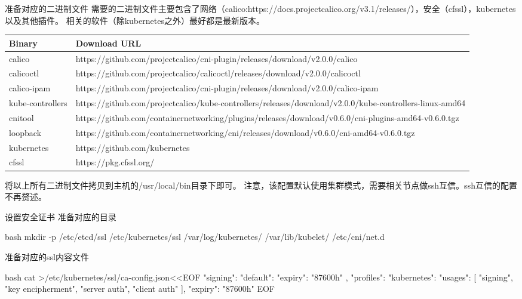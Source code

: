 \begin{outline}[enumerate]
  \1 准备对应的二进制文件
需要的二进制文件主要包含了网络（calico:https://docs.projectcalico.org/v3.1/releases/），安全（cfssl），kubernetes以及其他插件。
相关的软件（除kubernetes之外）最好都是最新版本。
\par{} \linewidth\textwidth
\begin{center}
  \begin{tabularx}{\textwidth}{|l|X|}
  \hline
  Binary & Download URL\\ \hline
  calico & https://github.com/projectcalico/cni-plugin/releases/download/v2.0.0/calico\\
  calicoctl & https://github.com/projectcalico/calicoctl/releases/download/v2.0.0/calicoctl \\
  calico-ipam & https://github.com/projectcalico/cni-plugin/releases/download/v2.0.0/calico-ipam \\
  kube-controllers & https://github.com/projectcalico/kube-controllers/releases/download/v2.0.0/kube-controllers-linux-amd64 \\
  cnitool & https://github.com/containernetworking/plugins/releases/download/v0.6.0/cni-plugins-amd64-v0.6.0.tgz \\
  loopback & https://github.com/containernetworking/cni/releases/download/v0.6.0/cni-amd64-v0.6.0.tgz \\
  kubernetes & https://github.com/kubernetes \\
  cfssl & https://pkg.cfssl.org/ \\
  \hline
  \end{tabularx}
  \label{tab:Binary files}
\end{center}
将以上所有二进制文件拷贝到主机的/usr/local/bin目录下即可。
注意，该配置默认使用集群模式，需要相关节点做ssh互信。ssh互信的配置不再赘述。

  \1 设置安全证书
准备对应的目录
\begin{code-in-enumerate}{bash}
mkdir -p /etc/etcd/ssl /etc/kubernetes/ssl /var/log/kubernetes/ /var/lib/kubelet/ /etc/cni/net.d
\end{code-in-enumerate}
准备对应的ssl内容文件
\begin{code-in-enumerate}{bash}
cat >/etc/kubernetes/ssl/ca-config.json<<EOF
{
    "signing": {
        "default": {
            "expiry": "87600h"
        },
        "profiles": {
            "kubernetes": {
                "usages": [
                    "signing",
                    "key encipherment",
                    "server auth",
                    "client auth"
                ],
                "expiry": "87600h"
            }
        }
    }
}
EOF


\end{code-in-enumerate}
\end{outline}

